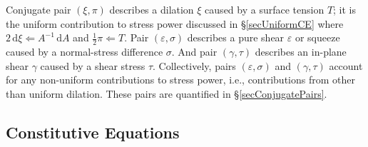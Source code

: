 Conjugate pair $( \xi , \pi )$ describes a dilation $\xi$ caused by a surface tension $T$; it is the uniform contribution to stress power discussed in \S\ref{secUniformCE} where $2 \, \mathrm{d} \xi \Leftarrow A^{-1} \, \mathrm{d} A$ and $\tfrac{1}{2} \pi \Leftarrow T$.  Pair $( \varepsilon , \sigma )$ describes a pure shear $\varepsilon$ or squeeze caused by a normal-stress difference $\sigma$.  And pair $( \gamma , \tau )$ describes an in-plane shear $\gamma$ caused by a shear stress $\tau$. Collectively, pairs $( \varepsilon , \sigma )$ and $( \gamma , \tau )$ account for any non-uniform contributions to stress power, i.e., contributions from other than uniform dilation.  These pairs are quantified in \S\ref{secConjugatePairs}.

\subsection{Constitutive Equations}

